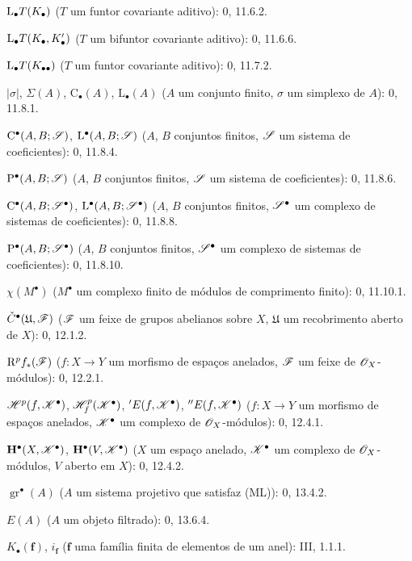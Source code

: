 \begin{flushleft}
$\mathrm{L}_\bullet T(K_\bullet)$ ($T$ um funtor covariante aditivo): 0, 11.6.2.

$\mathrm{L}_\bullet T(K_\bullet,K'_\bullet)$ ($T$ um bifuntor covariante
aditivo): 0, 11.6.6.

$\mathrm{L}_\bullet T(K_{\bullet\bullet})$ ($T$ um funtor covariante aditivo):
0, 11.7.2.

$|\sigma|$, $\Sigma(A)$, $\mathrm C_\bullet(A)$, $\mathrm L_\bullet(A)$
($A$ um conjunto finito, $\sigma$ um simplexo de $A$): 0, 11.8.1.

$\mathrm C^\bullet(A,B;\mathscr{S})$, $\mathrm L^\bullet(A,B;\mathscr{S})$
($A$, $B$ conjuntos finitos, $\mathscr{S}$ um sistema de coeficientes): 0, 11.8.4.

$\mathrm P^\bullet(A,B;\mathscr{S})$ ($A$, $B$ conjuntos finitos, $\mathscr{S}$ um
sistema de coeficientes): 0, 11.8.6.

$\mathrm C^\bullet(A,B;\mathscr{S}^\bullet)$,
$\mathrm L^\bullet(A,B;\mathscr{S}^\bullet)$ ($A$, $B$ conjuntos finitos,
$\mathscr{S}^\bullet$ um complexo de sistemas de coeficientes): 0, 11.8.8.

$\mathrm P^\bullet(A,B;\mathscr{S}^\bullet)$ ($A$, $B$ conjuntos finitos,
$\mathscr{S}^\bullet$ um complexo de sistemas de coeficientes): 0, 11.8.10.

$\chi(M^\bullet)$ ($M^\bullet$ um complexo finito de módulos de comprimento finito):
0, 11.10.1.

$\check C^\bullet(\mathfrak U,\mathscr{F})$ ($\mathscr{F}$ um feixe de grupos abelianos
sobre $X$, $\mathfrak U$ um recobrimento aberto de $X$): 0, 12.1.2.

$\mathrm{R}^p f_*(\mathscr{F})$ ($f:X\to Y$ um morfismo de espaços anelados,
$\mathscr{F}$ um feixe de $\mathscr{O}_X$-módulos): 0, 12.2.1.

$\mathscr{H}^p(f,\mathscr{K}^\bullet)$,
$\mathscr{H}^p_f(\mathscr{K}^\bullet)$, ${}'E(f,\mathscr{K}^\bullet)$,
${}''E(f,\mathscr{K}^\bullet)$ ($f:X\to Y$ um morfismo de espaços anelados,
$\mathscr{K}^\bullet$ um complexo de $\mathscr{O}_X$-módulos): 0, 12.4.1.

$\mathbf H^\bullet(X,\mathscr{K}^\bullet)$,
$\mathbf H^\bullet(V,\mathscr{K}^\bullet)$ ($X$ um espaço anelado,
$\mathscr{K}^\bullet$ um complexo de $\mathscr{O}_X$-módulos, $V$ aberto em $X$):
0, 12.4.2.

$\operatorname{gr}^\bullet(A)$ ($A$ um sistema projetivo que satisfaz (ML)):
0, 13.4.2.

$E(A)$ ($A$ um objeto filtrado): 0, 13.6.4.

$K_\bullet(\mathbf f)$, $i_{\mathbf f}$ ($\mathbf f$ uma família finita de
elementos de um anel): III, 1.1.1.


\end{flushleft}
